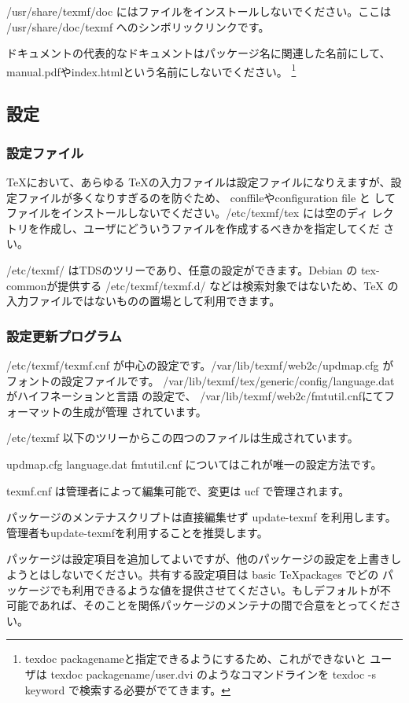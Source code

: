 \documentclass[mingoth,a4paper]{jsarticle}
\begin{document}
/usr/share/texmf/doc にはファイルをインストールしないでください。ここは 
/usr/share/doc/texmf へのシンボリックリンクです。

ドキュメントの代表的なドキュメントはパッケージ名に関連した名前にして、
manual.pdfやindex.htmlという名前にしないでください。
\footnote{texdoc packagenameと指定できるようにするため、これができないと
ユーザは texdoc packagename/user.dvi のようなコマンドラインを texdoc -s
keyword で検索する必要がでてきます。}

\subsection{設定}
\subsubsection{設定ファイル}

\TeX において、あらゆる \TeX の入力ファイルは設定ファイルになりえますが、設
定ファイルが多くなりすぎるのを防ぐため、 conffileやconfiguration file と
してファイルをインストールしないでください。/etc/texmf/tex には空のディ
レクトリを作成し、ユーザにどういうファイルを作成するべきかを指定してくだ
さい。

/etc/texmf/ はTDSのツリーであり、任意の設定ができます。Debian の 
tex-commonが提供する /etc/texmf/texmf.d/ などは検索対象ではないため、\TeX
の入力ファイルではないものの置場として利用できます。

\subsubsection{設定更新プログラム}

 /etc/texmf/texmf.cnf が中心の設定です。/var/lib/texmf/web2c/updmap.cfg 
がフォントの設定ファイルです。
/var/lib/texmf/tex/generic/config/language.dat がハイフネーションと言語
の設定で、 /var/lib/texmf/web2c/fmtutil.cnfにてフォーマットの生成が管理
されています。

/etc/texmf 以下のツリーからこの四つのファイルは生成されています。

updmap.cfg language.dat fmtutil.cnf についてはこれが唯一の設定方法です。

texmf.cnf は管理者によって編集可能で、変更は ucf で管理されます。

パッケージのメンテナスクリプトは直接編集せず update-texmf を利用します。
管理者もupdate-texmfを利用することを推奨します。

パッケージは設定項目を追加してよいですが、他のパッケージの設定を上書きし
ようとはしないでください。共有する設定項目は basic \TeX packages でどの
パッケージでも利用できるような値を提供させてください。もしデフォルトが不
可能であれば、そのことを関係パッケージのメンテナの間で合意をとってくださ
い。
\end{document}
